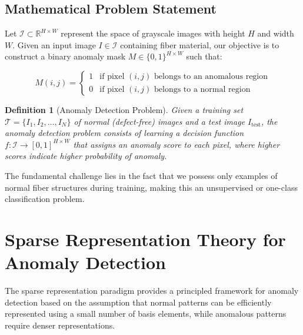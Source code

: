 \documentclass[12pt]{article}
\newtheorem{definition}[theorem]{Definition}
\begin{document}
\subsection{Mathematical Problem Statement}
\label{subsec:problem_statement}

Let $\mathcal{I} \subset \mathbb{R}^{H \times W}$ represent the space of grayscale images with height $H$ and width $W$. Given an input image $I \in \mathcal{I}$ containing fiber material, our objective is to construct a binary anomaly mask $M \in \{0,1\}^{H \times W}$ such that:

\begin{equation}
    \label{eq:mask_definition}
    M(i,j) = \begin{cases}
        1 & \text{if pixel }(i,j)\text{ belongs to an anomalous region} \\
        0 & \text{if pixel }(i,j)\text{ belongs to a normal region}
    \end{cases}
\end{equation}

\begin{definition}[Anomaly Detection Problem]
    \label{def:anomaly_detection}
    Given a training set $\mathcal{T} = \{I_1, I_2, \ldots, I_N\}$ of normal (defect-free) images and a test image $I_{\text{test}}$, the anomaly detection problem consists of learning a decision function $f: \mathcal{I} \rightarrow [0,1]^{H \times W}$ that assigns an anomaly score to each pixel, where higher scores indicate higher probability of anomaly.
\end{definition}

The fundamental challenge lies in the fact that we possess only examples of normal fiber structures during training, making this an unsupervised or one-class classification problem.

\newpage

\section{Sparse Representation Theory for Anomaly Detection}
\label{sec:sparse_theory}

The sparse representation paradigm provides a principled framework for anomaly detection based on the assumption that normal patterns can be efficiently represented using a small number of basis elements, while anomalous patterns require denser representations.
\end{document}
